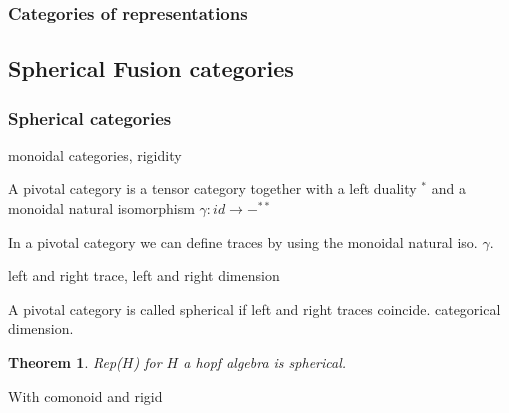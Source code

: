 \documentclass{article}
\newtheorem{theorem}{Theorem}[section]
\newenvironment{proof}[1][Proof]{\begin{trivlist}
\item[\hskip \labelsep {\bfseries #1}]}{\end{trivlist}}
\newenvironment{definition}[1][Definition]{\begin{trivlist}
\item[\hskip \labelsep {\bfseries #1}]}{\end{trivlist}}
\begin{document}
\subsubsection{Categories of representations}


\subsection{Spherical Fusion categories}

\subsubsection{Spherical categories}
\begin{definition}
monoidal categories, rigidity
\end{definition}
\begin{definition}
A pivotal category is a tensor category together with a left duality $^*$ and a monoidal natural isomorphism $\gamma:id \rightarrow -^{**}$
\end{definition}
In a pivotal category we can define traces by using the monoidal natural iso. $\gamma$.
\begin{definition}
left and right trace, left and right dimension
\end{definition}
\begin{definition}
A pivotal category is called spherical if left and right traces coincide. categorical dimension.
\end{definition}
\begin{theorem}
Rep($H$) for $H$ a hopf algebra is spherical.
\end{theorem}
\begin{proof}
With comonoid and rigid
\end{proof}
\end{document}
